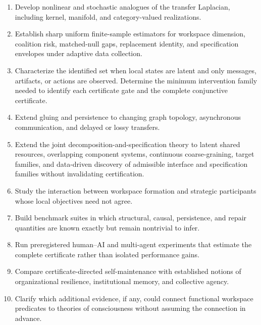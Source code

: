 \documentclass[11pt,letterpaper]{article}
\theoremstyle{plain}
\theoremstyle{definition}
\begin{document}
\begin{enumerate}
\item Develop nonlinear and stochastic analogues of the transfer Laplacian, including kernel, manifold,
and category-valued realizations.

\item Establish sharp uniform finite-sample estimators for workspace dimension, coalition risk,
matched-null gaps, replacement identity, and specification envelopes under adaptive data collection.

\item Characterize the identified set when local states are latent and only messages, artifacts, or
actions are observed. Determine the minimum intervention family needed to identify each certificate gate
and the complete conjunctive certificate.

\item Extend gluing and persistence to changing graph topology, asynchronous communication, and
delayed or lossy transfers.

\item Extend the joint decomposition-and-specification theory to latent shared resources, overlapping
component systems, continuous coarse-graining, target families, and data-driven discovery of admissible
interface and specification families without invalidating certification.

\item Study the interaction between workspace formation and strategic participants whose local objectives
need not agree.

\item Build benchmark suites in which structural, causal, persistence, and repair quantities are known
exactly but remain nontrivial to infer.

\item Run preregistered human--AI and multi-agent experiments that estimate the complete certificate
rather than isolated performance gains.

\item Compare certificate-directed self-maintenance with established notions of organizational resilience,
institutional memory, and collective agency.

\item Clarify which additional evidence, if any, could connect functional workspace predicates to theories
of consciousness without assuming the connection in advance.
\end{enumerate}
\end{document}
